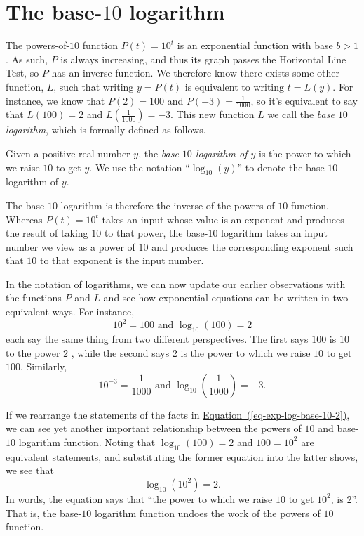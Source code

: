 \documentclass[nooutcomes]{ximera}
\begin{document}
\section{The base-\(10\) logarithm}

The powers-of-\(10\) function \(P(t) = 10^t\) is an exponential function with base \(b \gt 1\).  As such, \(P\) is always increasing, and thus its graph passes the Horizontal Line Test, so \(P\) has an inverse function.  We therefore know there exists some other function, \(L\), such that writing \(y = P(t)\) is equivalent to writing \(t = L(y)\).  For instance, we know that \(P(2)=100\) and \(P(-3)=\frac{1}{1000}\), so it's equivalent to say that \(L(100) = 2\) and \(L(\frac{1}{1000}) = -3\).  This new function \(L\) we call the \emph{base \(10\) logarithm}, which is formally defined as follows.%

Given a positive real number \(y\), the \emph{base-\(10\) logarithm of \(y\)} is the power to which we raise \(10\) to get \(y\).  We use the notation ``\(\log_{10}(y)\)'' to denote the base-\(10\) logarithm of \(y\).%

The base-\(10\) logarithm is therefore the inverse of the powers of \(10\) function.  Whereas \(P(t) = 10^t\) takes an input whose value is an exponent and produces the result of taking \(10\) to that power, the base-\(10\) logarithm takes an input number we view as a power of \(10\) and produces the corresponding exponent such that \(10\) to that exponent is the input number.%

In the notation of logarithms, we can now update our earlier observations with the functions \(P\) and \(L\) and see how exponential equations can be written in two equivalent ways.  For instance,%
\begin{equation}
10^2 = 100 \text{ and } \log_{10}(100) = 2\label{eq-exp-log-base-10-2}
\end{equation}
each say the same thing from two different perspectives.  The first says \(100\) is \(10\) to the power \(2\) , while the second says \(2\) is the power to which we raise \(10\) to get \(100\).  Similarly,%
\begin{equation}
10^{-3} = \frac{1}{1000} \text{ and } \log_{10} \left( \frac{1}{1000} \right) = -3\text{.}\label{eq-exp-log-base-10-minus-3}
\end{equation}

If we rearrange the statements of the facts in \hyperref[eq-exp-log-base-10-2]{Equation~(\ref{eq-exp-log-base-10-2})}, we can see yet another important relationship between the powers of \(10\) and base-\(10\) logarithm function.  Noting that \(\log_{10}(100) = 2\) and \(100 = 10^2\) are equivalent statements, and substituting the former equation into the latter shows, we see that%
\begin{equation}
\log_{10}(10^2) = 2\text{.}
\end{equation}
In words, the equation says that ``the power to which we raise \(10\) to get \(10^2\), is \(2\)''.  That is, the base-\(10\) logarithm function undoes the work of the powers of \(10\) function.%
\end{document}
